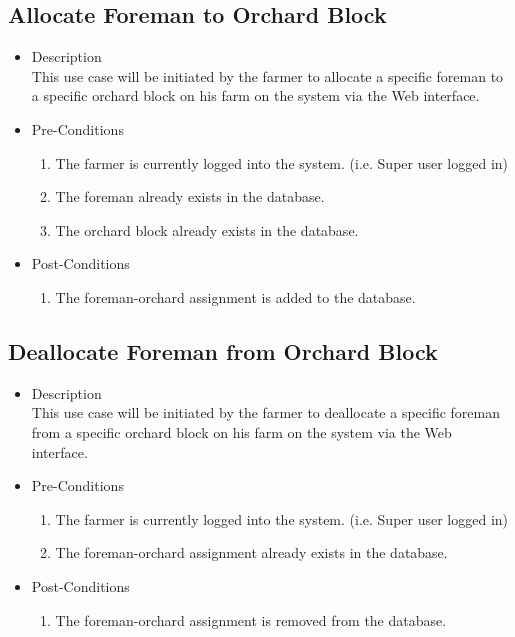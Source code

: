 \documentclass[11pt,fleqn]{book} %
\begin{document}
		\subsection{Allocate Foreman to Orchard Block}
		\begin{itemize}
			\item Description\\
			This use case will be initiated by the farmer to allocate a specific foreman to a specific orchard block on his farm on the system via the Web interface.
			\item Pre-Conditions
			\begin{enumerate}
				\item The farmer is currently logged into the system. (i.e. Super user logged in)
				\item The foreman already exists in the database. 
				\item The orchard block already exists in the database. 								
			\end{enumerate}
			\item Post-Conditions
			\begin{enumerate}
				\item The foreman-orchard assignment is added to the database.
			\end{enumerate}
		\end{itemize}
		
		\subsection{Deallocate Foreman from Orchard Block}
		\begin{itemize}
			\item Description\\
			This use case will be initiated by the farmer to deallocate a specific foreman from a specific orchard block on his farm on the system via the Web interface.
			\item Pre-Conditions
			\begin{enumerate}
				\item The farmer is currently logged into the system. (i.e. Super user logged in)
				\item The foreman-orchard assignment already exists in the database.		
			\end{enumerate}
			\item Post-Conditions
			\begin{enumerate}
				\item The foreman-orchard assignment is removed from the database.
			\end{enumerate}
		\end{itemize}
		
\end{document}
